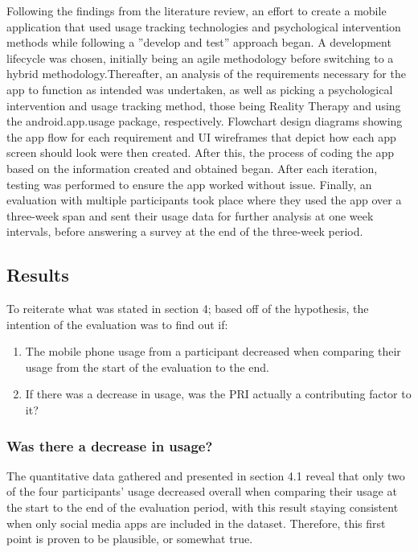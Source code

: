 \documentclass[12pt]{article}
\begin{document}
Following the findings from the literature review, an effort to create a mobile application that used usage tracking technologies and psychological intervention methods while following a 
”develop and test” approach began. A development lifecycle was chosen, initially being an agile methodology before switching to a hybrid methodology.Thereafter, an analysis of the requirements 
necessary for the app to function as intended was undertaken, as well as picking a psychological intervention and usage tracking method, those being Reality Therapy and using the
android.app.usage package, respectively. Flowchart design diagrams showing the app flow for each requirement and UI wireframes that depict how each app screen should look were then created. 
After this, the process of coding the app based on the information created and obtained began. After each iteration, testing was performed to ensure the app worked without issue. Finally, an 
evaluation with multiple participants took place where they used the app over a three-week span and sent their usage data for further analysis at one week intervals, before answering a survey 
at the end of the three-week period.

\subsection{Results}
To reiterate what was stated in section 4; based off of the hypothesis, the intention of the evaluation was to find out if:

\begin{enumerate}
	\item The mobile phone usage from a participant decreased when comparing their usage from the start of the evaluation to the end.
	\item If there was a decrease in usage, was the PRI actually a contributing factor to it?
\end{enumerate}

\subsubsection{Was there a decrease in usage?}
The quantitative data gathered and presented in section 4.1 reveal that only two of the four participants' usage decreased overall when comparing their usage at the start to the end of 
the evaluation period, with this result staying consistent when only social media apps are included in the dataset. Therefore, this first point is proven to be plausible, or somewhat true.
\end{document}
